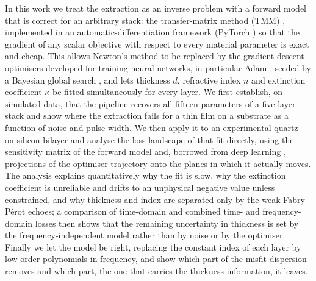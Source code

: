 \documentclass{optica-article}
\newcommand{\kap}{\kappa}
\begin{document}
In this work we treat the extraction as an inverse problem \cite{Tarantola2005,Aster2018} with a forward model that is correct for an arbitrary stack: the transfer-matrix method (TMM) \cite{BornWolf1999,Yeh1988}, implemented in an automatic-differentiation framework (PyTorch \cite{Paszke2019,Baydin2018}) so that the gradient of any scalar objective with respect to every material parameter is exact and cheap. This allows Newton's method to be replaced by the gradient-descent optimisers developed for training neural networks, in particular Adam \cite{Kingma2017}, seeded by a Bayesian global search \cite{Mockus1978,Snoek2012,Shahriari2016,Greenall2017,Peretti2019}, and lets thickness $d$, refractive index $n$ and extinction coefficient $\kap$ be fitted simultaneously for every layer. We first establish, on simulated data, that the pipeline recovers all fifteen parameters of a five-layer stack and show where the extraction fails for a thin film on a substrate as a function of noise and pulse width. We then apply it to an experimental quartz-on-silicon bilayer and analyse the loss landscape of that fit directly, using the sensitivity matrix of the forward model and, borrowed from deep learning \cite{Li2018}, projections of the optimiser trajectory onto the planes in which it actually moves. The analysis explains quantitatively why the fit is slow, why the extinction coefficient is unreliable and drifts to an unphysical negative value unless constrained, and why thickness and index are separated only by the weak Fabry--P\'erot echoes; a comparison of time-domain and combined time- and frequency-domain losses then shows that the remaining uncertainty in thickness is set by the frequency-independent model rather than by noise or by the optimiser. Finally we let the model be right, replacing the constant index of each layer by low-order polynomials in frequency, and show which part of the misfit dispersion removes and which part, the one that carries the thickness information, it leaves.

\end{document}
